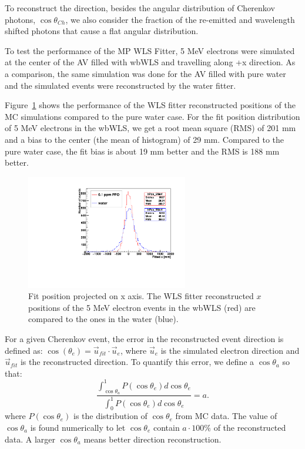 To reconstruct the direction, besides the angular distribution of Cherenkov photons, $\cos\theta_{Ch}$, we also consider the fraction of the re-emitted and wavelength shifted photons that cause a flat angular distribution.

To test the performance of the MP WLS Fitter, 5 MeV electrons were simulated at the center of the AV filled with wbWLS and travelling along +x direction. As a comparison, the same simulation was done for the AV filled with pure water and the simulated events were reconstructed by the water fitter.

Figure~\ref{WLSFitPos} shows the performance of the WLS fitter reconstructed positions of the MC simulations compared to the pure water case. For the fit position distribution of 5 MeV electrons in the wbWLS, we get a root mean square (RMS) of 201 mm and a bias to the center (the mean of histogram) of 29 mm. Compared to the pure water case, the fit bias is about 19 mm better and the RMS is 188 mm better.

\begin{figure}[htbp]	
	\centering			
	\includegraphics[height=5cm]{WLS_FittedPos.pdf}		
	\caption{\label{WLSFitPos} Fit position projected on x axis. The WLS fitter reconstructed $x$ positions of the 5 MeV electron events in the wbWLS (red) are compared to the ones in the water (blue).
	}
\end{figure}

For a given Cherenkov event, the error in the reconstructed event direction is defined as\cite{boulay2004direct}: $\cos(\theta_e)=\vec{u}_{fit}\cdot\vec{u}_e$, where $\vec{u}_e$ is the simulated electron direction and $\vec{u}_{fit}$ is the reconstructed direction. To quantify this error, we define a $\cos\theta_{a}$ so that:
\[
\frac{\int_{\cos\theta_{a}}^1 P(\cos\theta_e) d\cos\theta_e}{\int_0^1 P(\cos\theta_e) d\cos\theta_e} = a.
\] 
where $P(\cos\theta_e)$ is the distribution of $\cos\theta_e$ from MC data. The value of $\cos\theta_{a}$ is found numerically to let $\cos\theta_e$ contain $ a\cdot 100\%$ of the reconstructed data. A larger $\cos\theta_{a}$ means better direction reconstruction.

